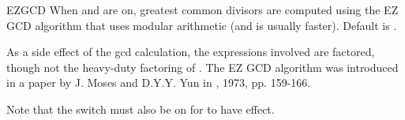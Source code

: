 \begin{Switch}{EZGCD}
When  and  are on, greatest common divisors are
computed using the EZ GCD algorithm that uses modular arithmetic (and is
usually faster).  Default is .

\begin{Comments}
As a side effect of the gcd calculation, the expressions involved are
factored, though not the heavy-duty factoring of . The
EZ GCD algorithm was introduced in a paper by J. Moses and D.Y.Y. Yun in
, 1973, pp. 159-166.

Note that the  switch must also be on for  to have
effect.
\end{Comments}
\end{Switch}


